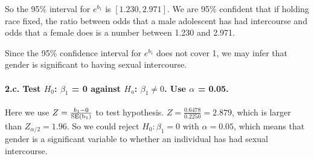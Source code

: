 \documentclass[]{article}
\let\oldparagraph\paragraph
\renewcommand{\paragraph}[1]{\oldparagraph{#1}\mbox{}}
\begin{document}
So the 95\% interval for \(e^{b_1}\) is \([1.230, 2.971]\). We are 95\%
confident that if holding race fixed, the ratio between odds that a male
adolescent has had intercourse and odds that a female does is a number
between 1.230 and 2.971.

Since the 95\% confidence interval for \(e^{b_1}\) does not cover 1, we
may infer that gender is significant to having sexual intercourse.

\hypertarget{c.-test-h_0-beta_1-0-against-h_a-beta_1-neq-0.-use-alpha-0.05.}{%
\paragraph{\texorpdfstring{2.c. Test \(H_0\): \(\beta_1\) = 0 against
\(H_a\): \(\beta_1 \neq 0\). Use \(\alpha\) =
0.05.}{2.c. Test H\_0: \textbackslash{}beta\_1 = 0 against H\_a: \textbackslash{}beta\_1 \textbackslash{}neq 0. Use \textbackslash{}alpha = 0.05.}}\label{c.-test-h_0-beta_1-0-against-h_a-beta_1-neq-0.-use-alpha-0.05.}}

Here we use \(Z = \frac{b_1 - 0}{\rm{SE}(b_1)}\) to test hypothesis.
\(Z = \frac{0.6478}{0.2250} = 2.879\), which is larger than
\(Z_{\alpha/2} = 1.96\). So we could reject \(H_0: \beta_1 = 0\) with
\(\alpha = 0.05\), which means that gender is a significant variable to
whether an individual has had sexual intercourse.
\end{document}
